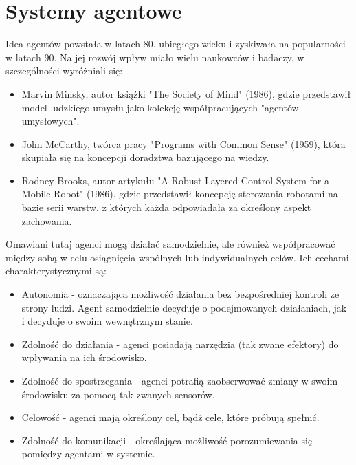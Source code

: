 \section{Systemy agentowe}

\par Idea agentów powstała w latach 80. ubiegłego wieku i zyskiwała na popularności w latach 90. Na jej rozwój wpływ miało wielu naukowców i badaczy, w szczególności wyróżniali się:

\begin{itemize}
    \item Marvin Minsky, autor książki "The Society of Mind" (1986), gdzie przedstawił model ludzkiego umysłu jako kolekcję współpracujących "agentów umysłowych".
    \item John McCarthy, twórca pracy "Programs with Common Sense" (1959), która skupiała się na koncepcji doradztwa bazującego na wiedzy.
    \item  Rodney Brooks, autor artykułu "A Robust Layered Control System for a Mobile Robot" (1986), gdzie przedstawił koncepcję sterowania robotami na bazie serii warstw, z których każda odpowiadała za określony aspekt zachowania.
\end{itemize}

\par Omawiani tutaj agenci mogą działać samodzielnie, ale również współpracować między sobą w celu osiągnięcia wspólnych lub indywidualnych celów. Ich cechami charakterystycznymi są:
\begin{itemize}
    \item Autonomia - oznaczająca możliwość działania bez bezpośredniej kontroli ze strony ludzi. Agent samodzielnie decyduje o podejmowanych działaniach, jak i decyduje o swoim wewnętrznym stanie.
    \item Zdolność do działania - agenci posiadają narzędzia (tak zwane efektory) do wpływania na ich środowisko.
    \item Zdolność do spostrzegania - agenci potrafią zaobserwować zmiany w swoim środowisku za pomocą tak zwanych sensorów.
    \item Celowość - agenci mają określony cel, bądź cele, które próbują spełnić.
    \item Zdolność do komunikacji - określająca możliwość porozumiewania się pomiędzy agentami w systemie.
\end{itemize}

